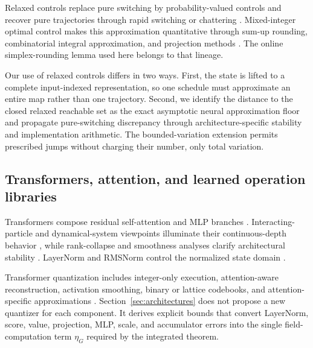 \documentclass[twoside,11pt]{article}
\begin{document}
Relaxed controls replace pure switching by probability-valued controls and recover pure trajectories through rapid switching or chattering \citep{Young1969,Warga1972}.  Mixed-integer optimal control makes this approximation quantitative through sum-up rounding, combinatorial integral approximation, and projection methods \citep{SagerReineltBock2009,SagerBockDiehl2012,SagerJungKirches2011,KirchesLendersManns2020,VasudevanEtAl2013Part1,VasudevanEtAl2013Part2}.  The online simplex-rounding lemma used here belongs to that lineage.

Our use of relaxed controls differs in two ways.  First, the state is lifted to a complete input-indexed representation, so one schedule must approximate an entire map rather than one trajectory.  Second, we identify the distance to the closed relaxed reachable set as the exact asymptotic neural approximation floor and propagate pure-switching discrepancy through architecture-specific stability and implementation arithmetic.  The bounded-variation extension permits prescribed jumps without charging their number, only total variation.

\subsection{Transformers, attention, and learned operation libraries}

Transformers compose residual self-attention and MLP branches \citep{VaswaniEtAl2017}.  Interacting-particle and dynamical-system viewpoints illuminate their continuous-depth behavior \citep{DuttaEtAl2021,GeshkovskiEtAl2025}, while rank-collapse and smoothness analyses clarify architectural stability \citep{DongCordonnierLoukas2021,WuEtAl2024,AbellaSilvestreTabuada2025,KimPapamakariosMnih2021,DasoulasEtAl2021,CastinAblinPeyre2024}.  LayerNorm and RMSNorm control the normalized state domain \citep{BaKirosHinton2016,ZhangSennrich2019}.

Transformer quantization includes integer-only execution, attention-aware reconstruction, activation smoothing, binary or lattice codebooks, and attention-specific approximations \citep{KimEtAl2021IBERT,FrantarEtAl2023GPTQ,XiaoEtAl2023SmoothQuant,LinEtAl2024AWQ,TsengEtAl2024QuIPSharp,HuangEtAl2024BiLLM,LiEtAl2024QLLMEval,XuEtAl2024PTQScaling,AdepuEtAl2024FrameQuant,HwangNguyenLee2026LSViT,QianEtAl2026QMHSA,XiaoZhangZhang2026BinaryAttention}.  Section~\ref{sec:architectures} does not propose a new quantizer for each component.  It derives explicit bounds that convert LayerNorm, score, value, projection, MLP, scale, and accumulator errors into the single field-computation term $\eta_G$ required by the integrated theorem.
\end{document}
